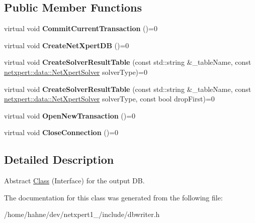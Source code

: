 \subsection*{Public Member Functions}
\begin{DoxyCompactItemize}
\item 
virtual void {\bfseries Commit\+Current\+Transaction} ()=0\hypertarget{classnetxpert_1_1io_1_1DBWriter_aa6cbde221c9cb281fc564ec5947e4a89}{}\label{classnetxpert_1_1io_1_1DBWriter_aa6cbde221c9cb281fc564ec5947e4a89}

\item 
virtual void {\bfseries Create\+Net\+Xpert\+DB} ()=0\hypertarget{classnetxpert_1_1io_1_1DBWriter_a9aed2a197051fa97b389c9adf7bb5c3b}{}\label{classnetxpert_1_1io_1_1DBWriter_a9aed2a197051fa97b389c9adf7bb5c3b}

\item 
virtual void {\bfseries Create\+Solver\+Result\+Table} (const std\+::string \&\+\_\+table\+Name, const \hyperlink{namespacenetxpert_1_1data_a923ee7cb7eab8b9dbfd62fb6d26f51cb}{netxpert\+::data\+::\+Net\+Xpert\+Solver} solver\+Type)=0\hypertarget{classnetxpert_1_1io_1_1DBWriter_a605512371218841f9cfcfcd3d9badeb0}{}\label{classnetxpert_1_1io_1_1DBWriter_a605512371218841f9cfcfcd3d9badeb0}

\item 
virtual void {\bfseries Create\+Solver\+Result\+Table} (const std\+::string \&\+\_\+table\+Name, const \hyperlink{namespacenetxpert_1_1data_a923ee7cb7eab8b9dbfd62fb6d26f51cb}{netxpert\+::data\+::\+Net\+Xpert\+Solver} solver\+Type, const bool drop\+First)=0\hypertarget{classnetxpert_1_1io_1_1DBWriter_a35dd9c00f0621302fcf9e8fe4810e6ea}{}\label{classnetxpert_1_1io_1_1DBWriter_a35dd9c00f0621302fcf9e8fe4810e6ea}

\item 
virtual void {\bfseries Open\+New\+Transaction} ()=0\hypertarget{classnetxpert_1_1io_1_1DBWriter_a6c30c6e65624efc60019ca619b1a5822}{}\label{classnetxpert_1_1io_1_1DBWriter_a6c30c6e65624efc60019ca619b1a5822}

\item 
virtual void {\bfseries Close\+Connection} ()=0\hypertarget{classnetxpert_1_1io_1_1DBWriter_af660494aa22a5ef6106aed7c8262f336}{}\label{classnetxpert_1_1io_1_1DBWriter_af660494aa22a5ef6106aed7c8262f336}

\end{DoxyCompactItemize}


\subsection{Detailed Description}
Abstract \hyperlink{classClass}{Class} (Interface) for the output DB. 

The documentation for this class was generated from the following file\+:\begin{DoxyCompactItemize}
\item 
/home/hahne/dev/netxpert1\+\_/include/dbwriter.\+h\end{DoxyCompactItemize}

